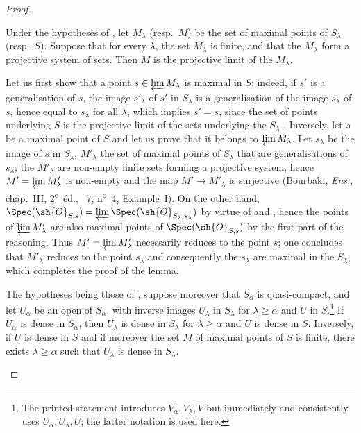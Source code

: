 \begin{proof}
\begin{lemma}[20.3.8.3]
\label{IV.20.3.8.3}
Under the hypotheses of , let $M_\lambda$ (resp.\ $M$) be the set of maximal points of $S_\lambda$ (resp.\ $S$).
Suppose that for every $\lambda$, the set $M_\lambda$ is finite, and that the $M_\lambda$ form a projective system of sets.
Then $M$ is the projective limit of the $M_\lambda$.
\end{lemma}

Let us first show that a point $s\in\varprojlim M_\lambda$ is maximal in $S$: indeed, if $s'$ is a generalisation of $s$, the image $s'_\lambda$ of $s'$ in $S_\lambda$ is a generalisation of the image $s_\lambda$ of $s$, hence equal to $s_\lambda$ for all $\lambda$, which implies $s'=s$, since the set of points underlying $S$ is the projective limit of the sets underlying the $S_\lambda$ .
Inversely, let $s$ be a maximal point of $S$ and let us prove that it belongs to $\varprojlim M_\lambda$.
Let $s_\lambda$ be the image of $s$ in $S_\lambda$, $M'_\lambda$ the set of maximal points of $S_\lambda$ that are generalisations of $s_\lambda$; the $M'_\lambda$ are non-empty finite sets forming a projective system, hence $M'=\varprojlim M'_\lambda$ is non-empty and the map $M'\to M'_\lambda$ is surjective (Bourbaki, \emph{Ens.}, chap.~III, 2\textsuperscript{e}~\'ed., \textsection~7, n\textsuperscript{o}~4, Example~I).
On the other hand, $\Spec(\sh{O}_{S,s})=\varprojlim\Spec(\sh{O}_{S_\lambda,s_\lambda})$ by virtue of  and , hence the points of $\varprojlim M'_\lambda$ are also maximal points of $\Spec(\sh{O}_{S,s})$ by the first part of the reasoning.
Thus $M'=\varprojlim M'_\lambda$ necessarily reduces to the point $s$; one concludes that $M'_\lambda$ reduces to the point $s_\lambda$ and consequently the $s_\lambda$ are maximal in the $S_\lambda$, which completes the proof of the lemma.

\begin{lemma}[20.3.8.4]
\label{IV.20.3.8.4}
The hypotheses being those of , suppose moreover that $S_\alpha$ is quasi-compact, and let $U_\alpha$ be an open of $S_\alpha$, with inverse images $U_\lambda$ in $S_\lambda$ for $\lambda\geq\alpha$ and $U$ in $S$.\footnote{The printed statement introduces $V_\alpha,V_\lambda,V$ but immediately and consistently uses $U_\alpha,U_\lambda,U$; the latter notation is used here.}
If $U_\alpha$ is dense in $S_\alpha$, then $U_\lambda$ is dense in $S_\lambda$ for $\lambda\geq\alpha$ and $U$ is dense in $S$.
Inversely, if $U$ is dense in $S$ and if moreover the set $M$ of maximal points of $S$ is finite, there exists $\lambda\geq\alpha$ such that $U_\lambda$ is dense in $S_\lambda$.
\end{lemma}


\end{proof}

